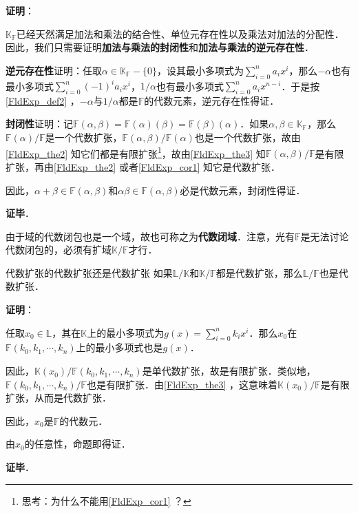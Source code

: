 \textbf{证明}：

$\mathbb{K}_{\mathbb{F}}$已经天然满足加法和乘法的结合性、单位元存在性以及乘法对加法的分配性．因此，我们只需要证明\textbf{加法与乘法的封闭性}和\textbf{加法与乘法的逆元存在性}．

\textbf{逆元存在性}证明：任取$\alpha\in\mathbb{K}_{\mathbb{F}}-\{0\}$，设其最小多项式为$\sum_{i=0}^{n}a_ix^i$，那么$-\alpha$也有最小多项式$\sum_{i=0}^n(-1)^ia_ix^i$，$1/\alpha$也有最小多项式$\sum_{i=0}^na_ix^{n-i}$．于是按\autoref{FldExp_def2} ，$-\alpha$与$1/\alpha$都是$\mathbb{F}$的代数元素，逆元存在性得证．

\textbf{封闭性}证明：记$\mathbb{F}(\alpha, \beta)=\mathbb{F}(\alpha)(\beta)=\mathbb{F}(\beta)(\alpha)$．如果$\alpha,\beta\in\mathbb{K}_{\mathbb{F}}$，那么$\mathbb{F}(\alpha)/\mathbb{F}$是一个代数扩张，$\mathbb{F}(\alpha, \beta)/\mathbb{F}(\alpha)$也是一个代数扩张，故由\autoref{FldExp_the2} 知它们都是有限扩张\footnote{思考：为什么不能用\autoref{FldExp_cor1} ？}，故由\autoref{FldExp_the3} 知$\mathbb{F}(\alpha, \beta)/\mathbb{F}$是有限扩张，再由\autoref{FldExp_the2} 或者\autoref{FldExp_cor1} 知它是代数扩张．

因此，$\alpha+\beta\in\mathbb{F}(\alpha, \beta)$和$\alpha\beta\in\mathbb{F}(\alpha, \beta)$必是代数元素，封闭性得证．

\textbf{证毕}．


由于域的代数闭包也是一个域，故也可称之为\textbf{代数闭域}．注意，光有$\mathbb{F}$是无法讨论代数闭包的，必须有扩域$\mathbb{K}/\mathbb{F}$才行．


\begin{corollary}{代数扩张的代数扩张还是代数扩张}\label{FldExp_cor2}
如果$\mathbb{L}/\mathbb{K}$和$\mathbb{K}/\mathbb{F}$都是代数扩张，那么$\mathbb{L}/\mathbb{F}$也是代数扩张．
\end{corollary}

\textbf{证明}：

任取$x_0\in\mathbb{L}$，其在$\mathbb{K}$上的最小多项式为$g(x) = \sum_{i=0}^n k_ix^i$．那么$x_0$在$\mathbb{F}(k_0, k_1, \cdots, k_n)$上的最小多项式也是$g(x)$．

因此，$\mathbb{K}(x_0)/\mathbb{F}(k_0, k_1, \cdots, k_n)$是单代数扩张，故是有限扩张．类似地，$\mathbb{F}(k_0, k_1, \cdots, k_n)/\mathbb{F}$也是有限扩张．由\autoref{FldExp_the3} ，这意味着$\mathbb{K}(x_0)/\mathbb{F}$是有限扩张，从而是代数扩张．

因此，$x_0$是$\mathbb{F}$的代数元．

由$x_0$的任意性，命题即得证．

\textbf{证毕}．





